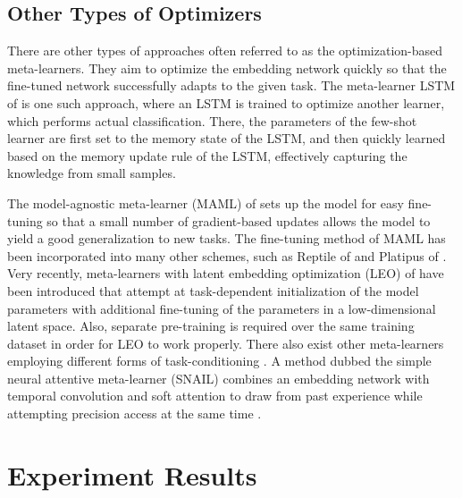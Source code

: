 \documentclass{article}
\begin{document}
  \subsection{Other Types of Optimizers}
  
  There are other types of approaches often referred to as the optimization-based meta-learners. 
  They aim to optimize the embedding network quickly so that the fine-tuned network successfully adapts to the given task. 
  The meta-learner LSTM of \cite{Ravi} is one such approach, where an LSTM  \cite{LSTM} is trained to optimize another learner, which performs actual classification. There, the parameters of the few-shot learner are first set to the memory state of the LSTM, and then quickly learned based on the memory update rule of the LSTM, effectively capturing the knowledge from small samples. 


  The model-agnostic meta-learner (MAML) of \cite{MAML} sets up the model for easy fine-tuning so that a small number of gradient-based updates allows the model to yield a good generalization to new tasks. The fine-tuning method of MAML has been incorporated into many other schemes, such as Reptile of \cite{REPTILE} and Platipus of \cite{PMAML}. 
  Very recently, meta-learners with latent embedding optimization (LEO) of \cite{LEO} have been introduced that attempt at task-dependent 
  initialization of the model parameters with additional fine-tuning of the parameters in a low-dimensional latent space. Also, separate pre-training is required over the same training dataset in order for LEO to work properly.
  There also exist other meta-learners employing different forms of task-conditioning \cite{adares}. 
  A method dubbed the simple neural attentive meta-learner (SNAIL) combines an embedding network with temporal convolution and soft attention to draw from past experience while attempting precision access at the same time 
  \cite{SNAIL}.  
  
\section{Experiment Results}
\end{document}
